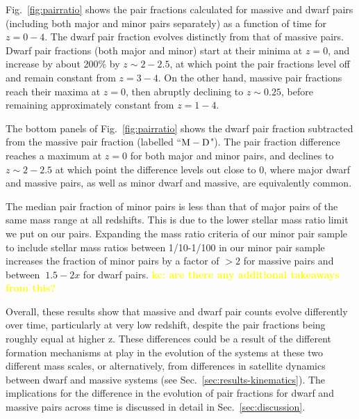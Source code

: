\documentclass[twocolumn]{aastex631}
\newcommand{\kc}[1]{\textcolor{yellow}{\textbf{kc: #1}} }
\begin{document}
    Fig.~\ref{fig:pairratio} shows the pair fractions calculated for massive and dwarf pairs (including both major and minor pairs separately) as a function of time for $z=0-4$. 
    The dwarf pair fraction evolves distinctly from that of massive pairs.
    Dwarf pair fractions (both major and minor) start at their minima at $z=0$, and increase by about 200\% by $z\sim2-2.5$, at which point the pair fractions level off and remain constant from $z=3-4$. 
    On the other hand, massive pair fractions reach their maxima at $z=0$, then abruptly declining to $z\sim0.25$, before remaining approximately constant from $z=1-4$. 
    
    The bottom panels of Fig.~\ref{fig:pairratio} shows the dwarf pair fraction subtracted from the massive pair fraction (labelled ``$\rm M-D$"). 
    The pair fraction difference reaches a maximum at $z=0$ for both major and minor pairs, and declines to $z\sim2-2.5$ at which point the difference levels out close to 0, where major dwarf and massive pairs, as well as minor dwarf and massive, are equivalently common. 
    
    The median pair fraction of minor pairs is less than that of major pairs of the same mass range at all redshifts. 
    This is due to the lower stellar mass ratio limit we put on our pairs. 
    Expanding the mass ratio criteria of our minor pair sample to include stellar mass ratios between 1/10-1/100 in our minor pair sample increases the fraction of minor pairs by a factor of $>2$ for massive pairs and between $~1.5-2x$ for dwarf pairs. \kc{are there any additional takeaways from this? }
    
    Overall, these results show that massive and dwarf pair counts evolve differently over time, particularly at very low redshift, despite the pair fractions being roughly equal at higher z. 
    These differences could be a result of the different formation mechanisms at play in the evolution of the systems at these two different mass scales, or alternatively, from differences in satellite dynamics between dwarf and massive systems (see Sec.~\ref{sec:results-kinematics}). 
    The implications for the difference in the evolution of pair fractions for dwarf and massive pairs across time is discussed in detail in Sec.~\ref{sec:discussion}.
    
\end{document}
